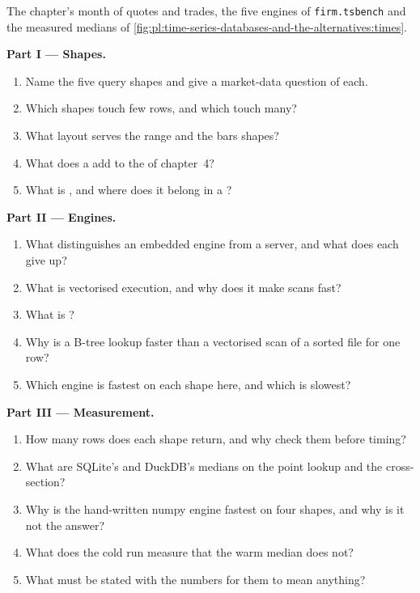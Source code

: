 \begin{problem}\label{pb:pl:time-series-databases-and-the-alternatives:1}
The chapter's month of quotes and trades, the five engines of \texttt{firm.tsbench} and the measured medians of
\cref{fig:pl:time-series-databases-and-the-alternatives:times}.

\medskip\noindent\textbf{Part I --- Shapes.}
\begin{enumerate}
\item Name the five query shapes and give a market-data question of each.
\item Which shapes touch few rows, and which touch many?
\item What layout serves the range and the bars shapes?
\item What does a  add to the  of chapter~4?
\item What is , and where does it belong in a ?
\end{enumerate}

\medskip\noindent\textbf{Part II --- Engines.}
\begin{enumerate}[resume]
\item What distinguishes an embedded engine from a server, and what does each give up?
\item What is vectorised execution, and why does it make scans fast?
\item What is ?
\item Why is a B-tree lookup faster than a vectorised scan of a sorted file for one row?
\item Which engine is fastest on each shape here, and which is slowest?
\end{enumerate}

\medskip\noindent\textbf{Part III --- Measurement.}
\begin{enumerate}[resume]
\item How many rows does each shape return, and why check them before timing?
\item What are SQLite's and DuckDB's medians on the point lookup and the cross-section?
\item Why is the hand-written numpy engine fastest on four shapes, and why is it not the answer?
\item What does the cold run measure that the warm median does not?
\item What must be stated with the numbers for them to mean anything?
\end{enumerate}


\end{problem}
